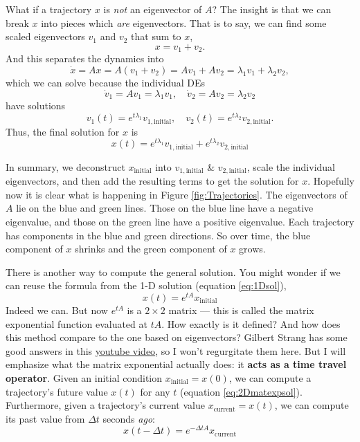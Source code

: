 \documentclass[11pt, oneside]{article}   	%
\begin{document}
What if a trajectory $x$ is \textit{not} an eigenvector of $A$?
The insight is that we can break $x$ into pieces which \textit{are} eigenvectors.
That is to say, we can find some scaled eigenvectors $v_1$ and $v_2$ that sum to $x$,
\begin{equation}
  x = v_1 + v_2.
\end{equation}
And this separates the dynamics into
\begin{equation}
  \dot{x} = Ax
  = A(v_1 + v_2)
  = A v_1 + A v_2
  = \lambda_1 v_1 + \lambda_2 v_2,
\end{equation}
which we can solve because the individual DEs
$$ \dot{v}_1 = A v_1 = \lambda_1 v_1, \quad \dot{v}_2 = A v_2 = \lambda_2 v_2 $$
have solutions
$$ v_1(t) = e^{t\lambda_1}v_{1,\mathrm{initial}}, \quad v_2(t) = e^{t\lambda_2}v_{2,\mathrm{initial}} .$$
Thus, the final solution for $x$ is
\begin{equation} \label{eq:2Deigensol}
  x(t) = e^{t\lambda_1}v_{1,\mathrm{initial}} + e^{t\lambda_2}v_{2,\mathrm{initial}}
\end{equation}

In summary, we deconstruct $x_\mathrm{initial}$ into $v_{1,\mathrm{initial}}$ \& $v_{2,\mathrm{initial}}$,
scale the individual eigenvectors, and then add the resulting terms to get the solution for $x$.
Hopefully now it is clear what is happening in Figure \ref{fig:Trajectories}.
The eigenvectors of $A$ lie on the blue and green lines.
Those on the blue line have a negative eigenvalue, and those on the green line have a positive eigenvalue.
Each trajectory has components in the blue and green directions.
So over time, the blue component of $x$ shrinks and the green component of $x$ grows.

There is another way to compute the general solution.
You might wonder if we can reuse the formula from the 1-D solution (equation \ref{eq:1Dsol}),
\begin{equation} \label{eq:2Dmatexpsol}
  x(t) = e^{tA} x_\mathrm{initial}
\end{equation}
Indeed we can.
But now $e^{tA}$ is a $2\times 2$ matrix --- this is called the matrix exponential function evaluated at $tA$.
How exactly is it defined?
And how does this method compare to the one based on eigenvectors?
Gilbert Strang has some good answers in this \href{https://youtu.be/LwSk9M5lJx4}{youtube video},
so I won't regurgitate them here.
But I will emphasize what the matrix exponential actually does: it \textbf{acts as a time travel operator}.
Given an initial condition $x_\mathrm{initial} = x(0)$, we can compute a trajectory's future value $x(t)$ for any $t$ (equation \ref*{eq:2Dmatexpsol}).
Furthermore, given a trajectory's current value $x_\mathrm{current} = x(t)$, we can compute its past value from $\Delta t$ seconds \textit{ago}:
\begin{equation}
  x(t-\Delta t) = e^{-\Delta t A} x_\mathrm{current}
\end{equation}
\end{document}
